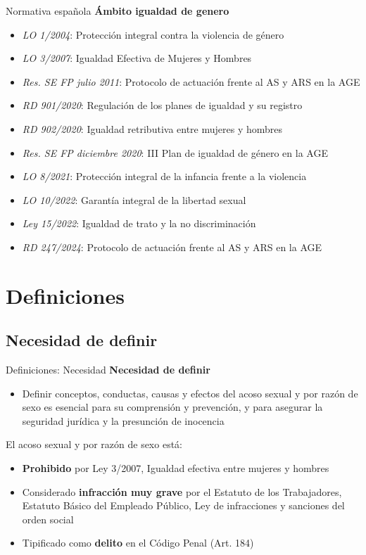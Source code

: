 \documentclass{beamer}
\begin{document}
    \begin{frame}{Normativa española}
        \textbf{Ámbito igualdad de genero}
        \begin{itemize}
            \item \textit{LO 1/2004}: Protección integral contra la violencia de género
            \item \textit{LO 3/2007}: Igualdad Efectiva de Mujeres y Hombres
            \item \textit{Res. SE FP julio 2011}: Protocolo de actuación frente al AS y ARS en la AGE
            \item \textit{RD 901/2020}: Regulación de los planes de igualdad y su registro
            \item \textit{RD 902/2020}: Igualdad retributiva entre mujeres y hombres
            \item \textit{Res. SE FP diciembre 2020}: III Plan de igualdad de género en la AGE
            \item \textit{LO 8/2021}: Protección integral de la infancia frente a la violencia
            \item \textit{LO 10/2022}: Garantía integral de la libertad sexual
            \item \textit{Ley 15/2022}: Igualdad de trato y la no discriminación
            \item \textit{RD 247/2024}: Protocolo de actuación frente al AS y ARS en la AGE
        \end{itemize}
    \end{frame}


    \section{Definiciones}

    \subsection{Necesidad de definir}
    \begin{frame}{Definiciones: Necesidad}
        \textbf{Necesidad de definir}
        \begin{itemize}
            \item Definir conceptos, conductas, causas y efectos del acoso sexual y por razón de sexo es esencial para su comprensión y prevención, y para asegurar la seguridad jurídica y la presunción de inocencia
        \end{itemize}
        El acoso sexual y por razón de sexo está:
        \begin{itemize}
            \item \textbf{Prohibido} por Ley 3/2007, Igualdad efectiva entre mujeres y hombres
            \item Considerado \textbf{infracción muy grave} por el Estatuto de los Trabajadores, Estatuto Básico del Empleado Público, Ley de infracciones y sanciones del orden social
            \item Tipificado como \textbf{delito} en el Código Penal (Art. 184)
        \end{itemize}
    \end{frame}
\end{document}
